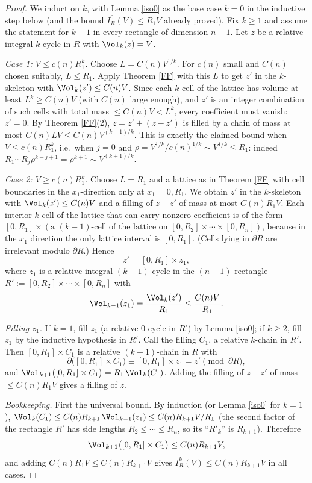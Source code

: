 \begin{proof}
We induct on $k$, with Lemma \ref{iso0} as the base case $k=0$ in the inductive step below (and the bound $I^0_R(V)\le R_1V$ already proved). Fix $k\ge 1$ and assume the statement for $k-1$ in every rectangle of dimension $n-1$. Let $z$ be a relative integral $k$-cycle in $R$ with $\Vol_k(z)=V$.

\smallskip\noindent\emph{Case 1: $V\le c(n)R_1^k$.}
Choose $L=C(n)V^{1/k}$. For $c(n)$ small and $C(n)$ chosen suitably, $L\le R_1$. Apply Theorem \ref{FF} with this $L$ to get $z'$ in the $k$-skeleton with $\Vol_k(z')\le C(n)V$. Since each $k$-cell of the lattice has volume at least $L^k\ge C(n)V$ (with $C(n)$ large enough), and $z'$ is an integer combination of such cells with total mass $\le C(n)V<L^k$, every coefficient must vanish: $z'=0$. By Theorem \ref{FF}(2), $z=z'+(z-z')$ is filled by a chain of mass at most $C(n)LV\le C(n)V^{(k+1)/k}$. This is exactly the claimed bound when $V\le c(n)R_1^k$, i.e.\ when $j=0$ and $\rho=V^{1/k}/c(n)^{1/k}\sim V^{1/k}\le R_1$: indeed $R_1\cdots R_j\rho^{k-j+1}=\rho^{k+1}\sim V^{(k+1)/k}$.

\smallskip\noindent\emph{Case 2: $V\ge c(n)R_1^k$.}
Choose $L=R_1$ and a lattice as in Theorem \ref{FF} with cell boundaries in the $x_1$-direction only at $x_1=0,R_1$. We obtain $z'$ in the $k$-skeleton with $\Vol_k(z')\le C(n)V$ and a filling of $z-z'$ of mass at most $C(n)R_1V$. Each interior $k$-cell of the lattice that can carry nonzero coefficient is of the form $[0,R_1]\times(\text{a }(k-1)\text{-cell of the lattice on }[0,R_2]\times\cdots\times[0,R_n])$, because in the $x_1$ direction the only lattice interval is $[0,R_1]$. (Cells lying in $\partial R$ are irrelevant modulo $\partial R$.) Hence
\[
z'=[0,R_1]\times z_1,
\]
where $z_1$ is a relative integral $(k-1)$-cycle in the $(n-1)$-rectangle $R':=[0,R_2]\times\cdots\times[0,R_n]$ with
\[
\Vol_{k-1}(z_1)=\frac{\Vol_k(z')}{R_1}\le \frac{C(n)V}{R_1}.
\]

\emph{Filling $z_1$.} If $k=1$, fill $z_1$ (a relative $0$-cycle in $R'$) by Lemma \ref{iso0}; if $k\ge2$, fill $z_1$ by the inductive hypothesis in $R'$. Call the filling $C_1$, a relative $k$-chain in $R'$. Then $[0,R_1]\times C_1$ is a relative $(k+1)$-chain in $R$ with
\[
\partial\big([0,R_1]\times C_1\big)\equiv [0,R_1]\times z_1=z' \pmod{\partial R},
\]
and $\Vol_{k+1}\big([0,R_1]\times C_1\big)=R_1\,\Vol_k(C_1)$. Adding the filling of $z-z'$ of mass $\le C(n)R_1V$ gives a filling of $z$.

\emph{Bookkeeping.} First the universal bound. By induction (or Lemma \ref{iso0} for $k=1$), $\Vol_k(C_1)\le C(n)R_{k+1}\,\Vol_{k-1}(z_1)\le C(n)R_{k+1}V/R_1$ (the second factor of the rectangle $R'$ has side lengths $R_2\le\cdots\le R_n$, so its ``$R'_{k}$'' is $R_{k+1}$). Therefore
\[
\Vol_{k+1}\big([0,R_1]\times C_1\big)\le C(n)R_{k+1}V,
\]
and adding $C(n)R_1V\le C(n)R_{k+1}V$ gives $I_R^k(V)\le C(n)R_{k+1}V$ in all cases.


\end{proof}
